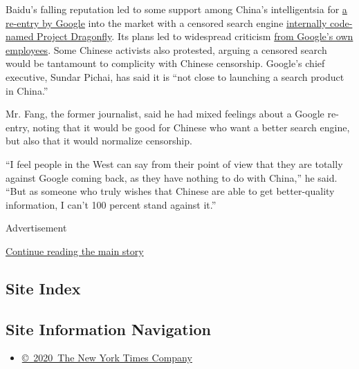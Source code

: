 Baidu's falling reputation led to some support among China's
intelligentsia for
\href{https://www.nytimes3xbfgragh.onion/2018/08/22/technology/google-china-conventionality.html}{a
re-entry by Google} into the market with a censored search engine
\href{https://www.nytimes3xbfgragh.onion/2018/08/01/technology/china-google-censored-search-engine.html}{internally
code-named Project Dragonfly}. Its plans led to widespread criticism
\href{https://www.nytimes3xbfgragh.onion/2018/08/16/technology/google-employees-protest-search-censored-china.html}{from
Google's own employees}. Some Chinese activists also protested, arguing
a censored search would be tantamount to complicity with Chinese
censorship. Google's chief executive, Sundar Pichai, has said it is
``not close to launching a search product in China.''

Mr. Fang, the former journalist, said he had mixed feelings about a
Google re-entry, noting that it would be good for Chinese who want a
better search engine, but also that it would normalize censorship.

``I feel people in the West can say from their point of view that they
are totally against Google coming back, as they have nothing to do with
China,'' he said. ``But as someone who truly wishes that Chinese are
able to get better-quality information, I can't 100 percent stand
against it.''

Advertisement

\protect\hyperlink{after-bottom}{Continue reading the main story}

\hypertarget{site-index}{%
\subsection{Site Index}\label{site-index}}

\hypertarget{site-information-navigation}{%
\subsection{Site Information
Navigation}\label{site-information-navigation}}

\begin{itemize}
\tightlist
\item
  \href{https://help.nytimes3xbfgragh.onion/hc/en-us/articles/115014792127-Copyright-notice}{©~2020~The
  New York Times Company}
\end{itemize}

